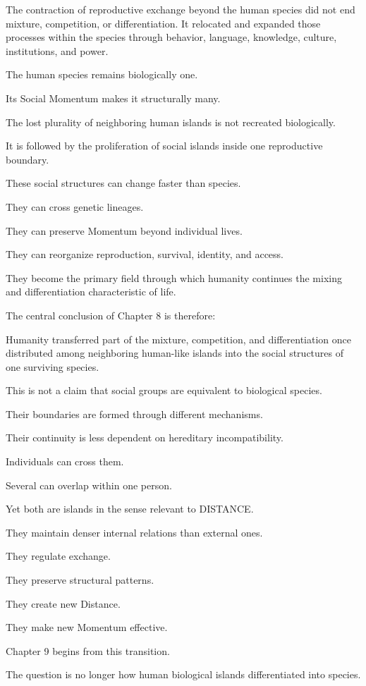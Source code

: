 The contraction of reproductive exchange beyond the human species did not end mixture, competition, or differentiation. It relocated and expanded those processes within the species through behavior, language, knowledge, culture, institutions, and power.

The human species remains biologically one.

Its Social Momentum makes it structurally many.

The lost plurality of neighboring human islands is not recreated biologically.

It is followed by the proliferation of social islands inside one reproductive boundary.

These social structures can change faster than species.

They can cross genetic lineages.

They can preserve Momentum beyond individual lives.

They can reorganize reproduction, survival, identity, and access.

They become the primary field through which humanity continues the mixing and differentiation characteristic of life.

The central conclusion of Chapter 8 is therefore:

Humanity transferred part of the mixture, competition, and differentiation once distributed among neighboring human-like islands into the social structures of one surviving species.

This is not a claim that social groups are equivalent to biological species.

Their boundaries are formed through different mechanisms.

Their continuity is less dependent on hereditary incompatibility.

Individuals can cross them.

Several can overlap within one person.

Yet both are islands in the sense relevant to DISTANCE.

They maintain denser internal relations than external ones.

They regulate exchange.

They preserve structural patterns.

They create new Distance.

They make new Momentum effective.

Chapter 9 begins from this transition.

The question is no longer how human biological islands differentiated into species.

